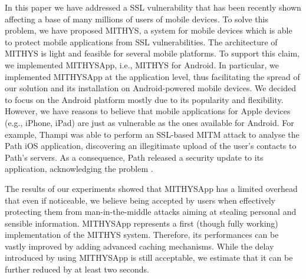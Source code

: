\documentclass[english]{llncs}
\begin{document}
In this paper we have addressed a SSL vulnerability that has been recently shown affecting a base of many millions of users of mobile devices. To solve this problem, we have proposed MITHYS, a system for mobile devices which is able to protect mobile applications from SSL vulnerabilities. The architecture of MITHYS is light and feasible for several mobile platforms. To support this claim, we implemented MITHYSApp, i.e., MITHYS for Android. In particular, we implemented MITHYSApp at the application level, thus facilitating the spread of our solution and its installation on Android-powered mobile devices. We decided to focus on the Android platform mostly due to its popularity and flexibility. However, we have reasons to believe that mobile applications for Apple devices (e.g., iPhone, iPad) are just as vulnerable as the ones available for Android. For example, Thampi \cite{mitmproxyandpath} was able to perform an SSL-based MITM attack to analyse the Path iOS application, discovering an illegitimate upload of the user's contacts to Path's servers. As a consequence, Path released a security update to its application, acknowledging the problem \cite{thepathfact}.

The results of our experiments showed that MITHYSApp has a limited overhead that even if noticeable, we believe being accepted by users when effectively protecting them from man-in-the-middle attacks aiming at stealing personal and sensible information. MITHYSApp represents a first (though fully working) implementation of the MITHYS system. Therefore, its performances can be vastly improved by adding advanced caching mechanisms. While the delay introduced by using MITHYSApp is still acceptable, we estimate that it can be further reduced by at least two seconds.






\end{document}
